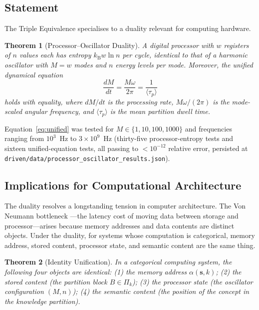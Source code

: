 \documentclass[twocolumn,11pt,a4paper]{article}
\newtheorem{theorem}{Theorem}[section]
\newcommand{\kb}{k_{\mathrm{B}}}
\begin{document}
\subsection{Statement}

The Triple Equivalence specialises to a duality relevant for computing hardware.

\begin{theorem}[Processor--Oscillator Duality]
\label{thm:duality}
A digital processor with $w$ registers of $n$ values each has entropy $\kb w \ln n$ per cycle, identical to that of a harmonic oscillator with $M = w$ modes and $n$ energy levels per mode. Moreover, the unified dynamical equation
\begin{equation}
\label{eq:unified}
\frac{dM}{dt} = \frac{M \omega}{2\pi} = \frac{1}{\langle \tau_p \rangle}
\end{equation}
holds with equality, where $dM/dt$ is the processing rate, $M\omega/(2\pi)$ is the mode-scaled angular frequency, and $\langle \tau_p \rangle$ is the mean partition dwell time.
\end{theorem}

Equation~\ref{eq:unified} was tested for $M \in \{1, 10, 100, 1000\}$ and frequencies ranging from $10^3$~Hz to $3 \times 10^9$~Hz (thirty-five processor-entropy tests and sixteen unified-equation tests, all passing to $< 10^{-12}$ relative error, persisted at \texttt{driven/data/processor\_oscillator\_results.json}).

\subsection{Implications for Computational Architecture}

The duality resolves a longstanding tension in computer architecture. The Von Neumann bottleneck \cite{hennessy2011computer}---the latency cost of moving data between storage and processor---arises because memory addresses and data contents are distinct objects. Under the duality, for systems whose computation is categorical, memory address, stored content, processor state, and semantic content are the same thing.

\begin{theorem}[Identity Unification]
\label{thm:identity}
In a categorical computing system, the following four objects are identical:
(1) the memory address $\alpha(\mathbf{s}, k)$;
(2) the stored content (the partition block $B \in \Pi_k$);
(3) the processor state (the oscillator configuration $(M, n)$);
(4) the semantic content (the position of the concept in the knowledge partition).
\end{theorem}
\end{document}
